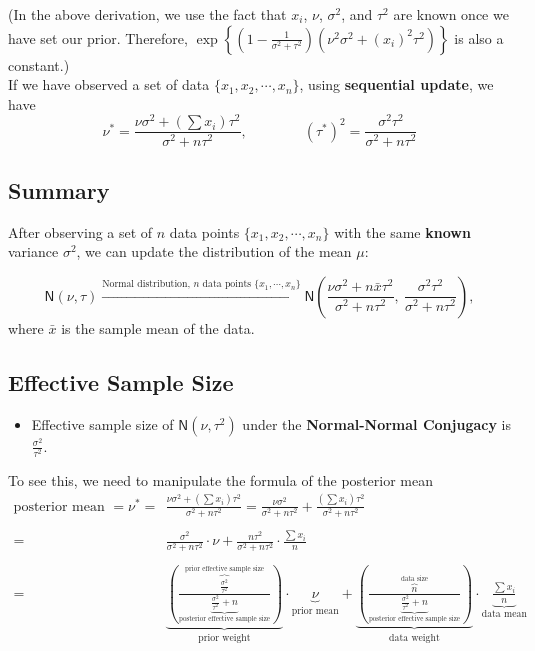 \documentclass{article}
\def\dsst{\displaystyle}
\begin{document}
(In the above derivation, we use the fact that $x_i$, $\nu$, $\sigma^2$, and $\tau^2$ are known once we have set our prior. Therefore, $\dsst \exp\left\{(1-\frac{1}{\sigma^2+\tau^2})(\nu^2\sigma^2+(x_i)^2\tau^2) \right\}$ is also a constant.)\\

If we have observed a set of data $\{x_1, x_2,\cdots,x_n \}$, using \textbf{sequential update}, we have
$$ \nu^* = \frac{\nu\sigma^2+\left(\sum x_i\right)\tau^2}{\sigma^2+n\tau^2},\qquad \qquad (\tau^*)^2 = \frac{\sigma^2\tau^2}{\sigma^2+n\tau^2} $$

\subsection{Summary}

After observing a set of $n$ data points $\{x_1, x_2, \cdots, x_n\}$ with the same \textbf{known} variance $\sigma^2$, we can update the distribution of the mean $\mu$:

$$ \textsf{N}(\nu, \tau)\xrightarrow{\text{Normal distribution, $n$ data points $\{x_1, \cdots, x_n\}$}} \textsf{N}\left(\frac{\nu\sigma^2+n\bar{x}\tau^2}{\sigma^2+n\tau^2},\ \frac{\sigma^2\tau^2}{\sigma^2+n\tau^2}\right), $$
where $\bar{x}$ is the sample mean of the data.

\subsection{Effective Sample Size}

\begin{itemize}
	\item Effective sample size of $\textsf{N}(\nu, \tau^2)$ under the \textbf{Normal-Normal Conjugacy} is $\dsst \frac{\sigma^2}{\tau^2}$.
\end{itemize}

To see this, we need to manipulate the formula of the posterior mean
\begin{align*}
\text{posterior mean }=\nu^* = & \frac{\nu\sigma^2+(\sum x_i)\tau^2}{\sigma^2+n\tau^2} = \frac{\nu\sigma^2}{\sigma^2+n\tau^2} + \frac{\left(\sum x_i\right)\tau^2}{\sigma^2+n\tau^2}\\
& \\
 = & \frac{\sigma^2}{\sigma^2+n\tau^2}\cdot \nu + \frac{n\tau^2}{\sigma^2+n\tau^2}\cdot \frac{\sum x_i}{n} \\
& \\
= & \underbrace{\left(\frac{\overbrace{\frac{\sigma^2}{\tau^2}}^\text{prior effective sample size}}{\underbrace{\frac{\sigma^2}{\tau^2}+n}_\text{posterior effective sample size}}\right)}_\text{prior weight}\cdot \underbrace{\nu}_\text{prior mean} + \underbrace{\left(\frac{\overbrace{n}^\text{data size}}{\underbrace{\frac{\sigma^2}{\tau^2}+n}_\text{posterior effective sample size}}\right)}_\text{data weight}\cdot \underbrace{\frac{\sum x_i}{n}}_\text{data mean}
\end{align*}
\end{document}
